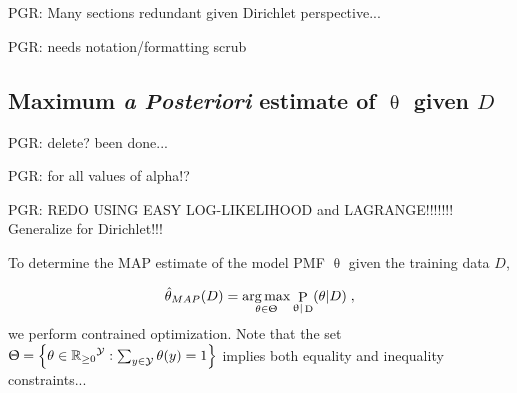 \documentclass[12pt]{report}
\DeclareMathOperator*{\argmax}{arg\,max}
\DeclareMathOperator{\Drm}{\mathrm{D}}
\DeclareMathOperator{\Prm}{\mathrm{P}}
\DeclareMathOperator{\Ycal}{\mathcal{Y}}
\DeclareMathOperator{\Rbbgeq}{\mathbb{R}_{\geq 0}}
\begin{document}
\chapter{}


PGR: Many sections redundant given Dirichlet perspective...

PGR: needs notation/formatting scrub



\section{Maximum \emph{a Posteriori} estimate of $\uptheta$ given $D$} \label{app:MAP_theta}

PGR: delete? been done...

PGR: for all values of alpha!?

PGR: REDO USING EASY LOG-LIKELIHOOD and LAGRANGE!!!!!!! Generalize for Dirichlet!!! 

To determine the MAP estimate of the model PMF $\uptheta$ given the training data $D$, 

\begin{equation}
\hat{\theta}_{MAP}(D) = \argmax_{\theta \in \Uptheta} \Prm_{\uptheta | \Drm}(\theta | D) \;,
\end{equation}
we perform contrained optimization. Note that the set $\Uptheta = \left\{ \theta \in {\Rbbgeq}^{\Ycal}: \sum_{y \in \Ycal} \theta(y) = 1 \right\}$ implies both equality and inequality constraints...
\end{document}

